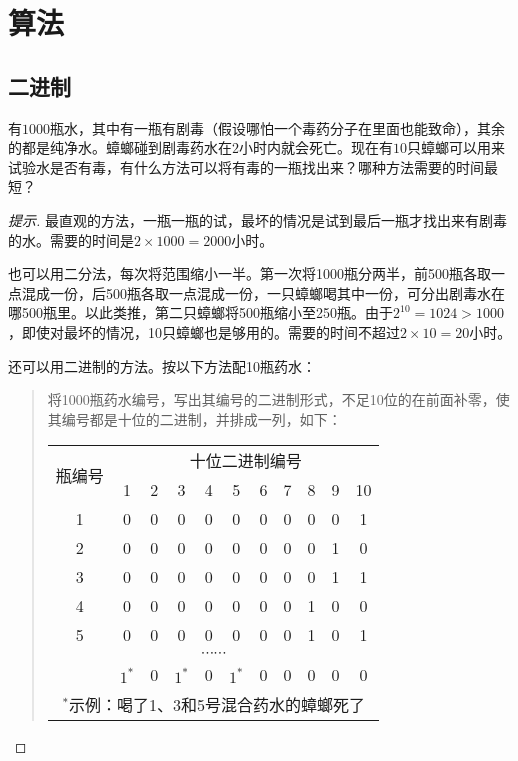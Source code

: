 
\chapter{算法}
\label{chap:algorithm}

\section{二进制}
\label{sec:binary-system}

\begin{example}
  有$1000$瓶水，其中有一瓶有剧毒（假设哪怕一个毒药分子在里面也能致命），其余的都是纯净水。蟑螂碰到剧毒药水在$2$小时内就会死亡。现在有$10$只蟑螂可以用来试验水是否有毒，有什么方法可以将有毒的一瓶找出来？哪种方法需要的时间最短？
\end{example}
\begin{proof}[提示]
  最直观的方法，一瓶一瓶的试，最坏的情况是试到最后一瓶才找出来有剧毒的水。需要的时间是$2\times1000=2000$小时。

  也可以用二分法，每次将范围缩小一半。第一次将1000瓶分两半，前500瓶各取一点混成一份，后500瓶各取一点混成一份，一只蟑螂喝其中一份，可分出剧毒水在哪500瓶里。以此类推，第二只蟑螂将500瓶缩小至250瓶。由于$2^10=1024>1000$，即使对最坏的情况，10只蟑螂也是够用的。需要的时间不超过$2\times10=20$小时。

  还可以用二进制的方法。按以下方法配10瓶药水：
  \begin{quotation}
    将1000瓶药水编号，写出其编号的二进制形式，不足10位的在前面补零，使其编号都是十位的二进制，并排成一列，如下：
    \begin{center}
    \begin{tabular}{ccccccccccc}
      \toprule[2pt]
      \multirow{2}{*}{瓶编号} & \multicolumn{10}{c}{十位二进制编号}\\
      \cline{2-11} & 1 & 2 & 3 & 4 & 5 & 6 & 7 & 8 & 9 & 10\\
      \midrule
      1 & 0 & 0 & 0 & 0 & 0 & 0 & 0 & 0 & 0 & 1\\
      2 & 0 & 0 & 0 & 0 & 0 & 0 & 0 & 0 & 1 & 0\\
      3 & 0 & 0 & 0 & 0 & 0 & 0 & 0 & 0 & 1 & 1\\
      4 & 0 & 0 & 0 & 0 & 0 & 0 & 0 & 1 & 0 & 0\\
      5 & 0 & 0 & 0 & 0 & 0 & 0 & 0 & 1 & 0 & 1\\
      \multicolumn{11}{c}{$\cdots\cdots$}\\
      \hline
        & $1^*$ & 0 & $1^*$ & 0 & $1^*$ & 0 & 0 & 0 & 0 & 0\\
      \multicolumn{11}{c}{$^*$示例：喝了1、3和5号混合药水的蟑螂死了}\\  
      \bottomrule[2pt]
    \end{tabular}
    \end{center}


\end{quotation}
\end{proof}
